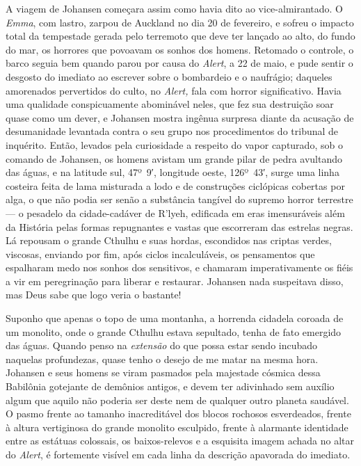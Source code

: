 \begin{pages}
\begin{Rightside}
A viagem de Johansen começara assim como havia dito ao vice-almirantado.
O \emph{Emma}, com lastro, zarpou de Auckland no dia 20 de fevereiro, e
sofreu o impacto total da tempestade gerada pelo terremoto que deve ter
lançado ao alto, do fundo do mar, os horrores que povoavam os sonhos dos
homens. Retomado o controle, o barco seguia bem quando parou por causa
do \emph{Alert}, a 22 de maio, e pude sentir o desgosto do imediato ao
escrever sobre o bombardeio e o naufrágio; daqueles amorenados
pervertidos do culto, no \emph{Alert,} fala com horror significativo.
Havia uma qualidade conspicuamente abominável neles, que fez sua
destruição soar quase como um dever, e Johansen mostra ingênua surpresa
diante da acusação de desumanidade levantada contra o seu grupo nos
procedimentos do tribunal de inquérito. Então, levados pela curiosidade
a respeito do vapor capturado, sob o comando de Johansen, os homens
avistam um grande pilar de pedra avultando das águas, e na latitude sul,
47º~9′, longitude oeste, 126º~43′, surge uma linha costeira feita de
lama misturada a lodo e de construções ciclópicas cobertas por alga, o
que não podia ser senão a substância tangível do supremo horror
terrestre --- o pesadelo da cidade-cadáver de R'lyeh, edificada em eras
imensuráveis além da História pelas formas repugnantes e vastas que
escorreram das estrelas negras. Lá repousam o grande Cthulhu e suas
hordas, escondidos nas criptas verdes, viscosas, enviando por fim, após
ciclos incalculáveis, os pensamentos que espalharam medo nos sonhos dos
sensitivos, e chamaram imperativamente os fiéis a vir em peregrinação
para liberar e restaurar. Johansen nada suspeitava disso, mas Deus sabe
que logo veria o bastante!

Suponho que apenas o topo de uma montanha, a horrenda cidadela coroada
de um monolito, onde o grande Cthulhu estava sepultado, tenha de fato
emergido das águas. Quando penso na \emph{extensão} do que possa estar
sendo incubado naquelas profundezas, quase tenho o desejo de me matar na
mesma hora. Johansen e seus homens se viram pasmados pela majestade
cósmica dessa Babilônia gotejante de demônios antigos, e devem ter
adivinhado sem auxílio algum que aquilo não poderia ser deste nem de
qualquer outro planeta saudável. O pasmo frente ao tamanho inacreditável
dos blocos rochosos esverdeados, frente à altura vertiginosa do grande
monolito esculpido, frente à alarmante identidade entre as estátuas
colossais, os baixos-relevos e a esquisita imagem achada no altar do
\emph{Alert}, é fortemente visível em cada linha da descrição apavorada
do imediato.


\end{Rightside}
\end{pages}
